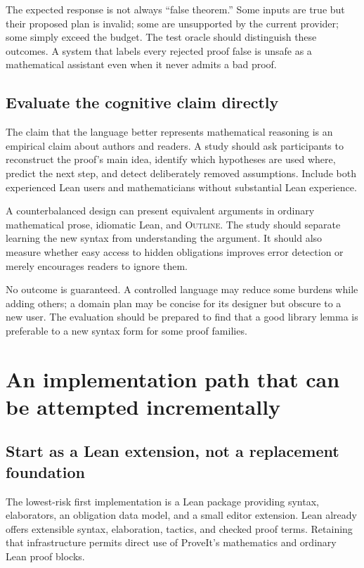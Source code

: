 \documentclass[11pt,a4paper]{article}
\newcommand{\Outline}{\textsc{Outline}}
\theoremstyle{definition}
\theoremstyle{remark}
\numberwithin{equation}{section}
\begin{document}
The expected response is not always ``false theorem.'' Some inputs are true but their proposed plan is invalid; some are unsupported by the current provider; some simply exceed the budget. The test oracle should distinguish these outcomes. A system that labels every rejected proof false is unsafe as a mathematical assistant even when it never admits a bad proof.

\subsection{Evaluate the cognitive claim directly}
The claim that the language better represents mathematical reasoning is an empirical claim about authors and readers. A study should ask participants to reconstruct the proof's main idea, identify which hypotheses are used where, predict the next step, and detect deliberately removed assumptions. Include both experienced Lean users and mathematicians without substantial Lean experience.

A counterbalanced design can present equivalent arguments in ordinary mathematical prose, idiomatic Lean, and \Outline. The study should separate learning the new syntax from understanding the argument. It should also measure whether easy access to hidden obligations improves error detection or merely encourages readers to ignore them.

No outcome is guaranteed. A controlled language may reduce some burdens while adding others; a domain plan may be concise for its designer but obscure to a new user. The evaluation should be prepared to find that a good library lemma is preferable to a new syntax form for some proof families.

\section{An implementation path that can be attempted incrementally}
\label{sec:implementation}
\subsection{Start as a Lean extension, not a replacement foundation}
The lowest-risk first implementation is a Lean package providing syntax, elaborators, an obligation data model, and a small editor extension. Lean already offers extensible syntax, elaboration, tactics, and checked proof terms.\cite{lean-reference} Retaining that infrastructure permits direct use of ProveIt's mathematics and ordinary Lean proof blocks.
\end{document}
